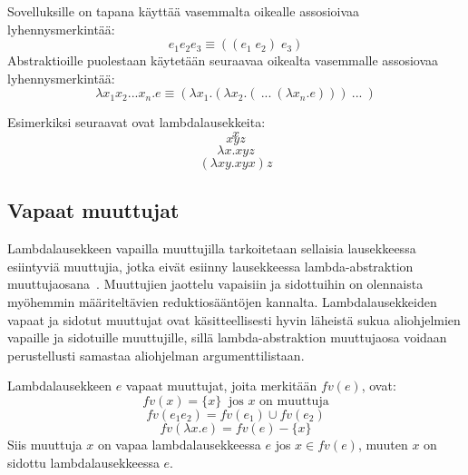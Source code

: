 Sovelluksille on tapana käyttää vasemmalta oikealle assosioivaa lyhennysmerkintää: 
\[e_{1} e_{2} e_{3} \equiv ((e_{1} \; e_{2}) \; e_{3})\]
Abstraktioille puolestaan käytetään seuraavaa oikealta vasemmalle assosiovaa lyhennysmerkintää: 
\[ \lambda x_{1}x_{2}...x_{n}.e \equiv (\lambda x_{1} . ( \lambda x_{2} . ( \: ... \: ( \lambda x_{n} . e ))) \: ... \: ) \]

\par
Esimerkiksi seuraavat ovat lambdalausekkeita:
\[ x \]
\[ xyz \]
\[ \lambda x . xyz \]
\[ (\lambda xy . xyx) z \]


\subsection{Vapaat muuttujat}

Lambdalausekkeen vapailla muuttujilla tarkoitetaan sellaisia lausekkeessa esiintyviä muuttujia, jotka eivät esiinny lausekkeessa lambda-abstraktion muuttujaosana~\cite[s.~8]{Hudak89}. Muuttujien jaottelu vapaisiin ja sidottuihin on olennaista myöhemmin määriteltävien reduktiosääntöjen kannalta. Lambdalausekkeiden vapaat ja sidotut muuttujat ovat käsitteellisesti hyvin läheistä sukua aliohjelmien vapaille ja sidotuille muuttujille, sillä lambda-abstraktion muuttujaosa voidaan perustellusti samastaa aliohjelman argumenttilistaan.

\begin{maar}
Lambdalausekkeen $e$ vapaat muuttujat, joita merkitään $fv(e)$, ovat: 
\[fv(x) = \{x\}\ \text{ jos } x \text{ on muuttuja} \]
\[fv(e_{1}e_{2}) = fv(e_{1}) \cup fv(e_{2}) \]
\[ fv(\lambda x.e) = fv(e) - \{x\} \]
Siis muuttuja $x$ on vapaa lambdalausekkeessa $e$ jos $x \in fv(e)$, muuten $x$ on sidottu lambdalausekkeessa $e$.
\end{maar} 

